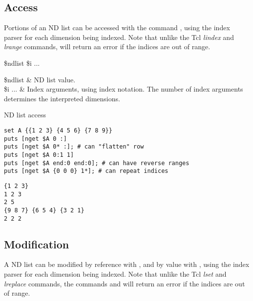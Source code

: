 \documentclass{article}
\begin{document}
\subsection{Access}
Portions of an ND list can be accessed with the command , using the index parser  for each dimension being indexed.
Note that unlike the Tcl \textit{lindex} and \textit{lrange} commands,  will return an error if the indices are out of range.
\begin{syntax}
 \$ndlist \$i ...
\end{syntax}
\begin{args}
\$ndlist & ND list value. \\
\$i ... & Index arguments, using index notation. The number of index arguments determines the interpreted dimensions.
\end{args}
\begin{example}{ND list access}
\begin{lstlisting}
set A {{1 2 3} {4 5 6} {7 8 9}}
puts [nget $A 0 :]
puts [nget $A 0* :]; # can "flatten" row
puts [nget $A 0:1 1]
puts [nget $A end:0 end:0]; # can have reverse ranges
puts [nget $A {0 0 0} 1*]; # can repeat indices
\end{lstlisting}
\tcblower
\begin{lstlisting}
{1 2 3}
1 2 3
2 5
{9 8 7} {6 5 4} {3 2 1}
2 2 2
\end{lstlisting}
\end{example}

\clearpage
\subsection{Modification}
A ND list can be modified by reference with , and by value with , using the index parser  for each dimension being indexed.
Note that unlike the Tcl \textit{lset} and \textit{lreplace} commands, the commands  and  will return an error if the indices are out of range.
\end{document}
